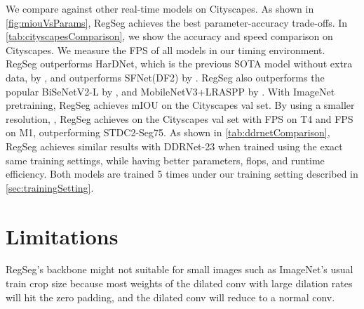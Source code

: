 \documentclass[10pt,twocolumn,letterpaper]{article}
\begin{document}
\begin{table}
  \centering
  \caption{Comparison against DDRNet-23 under the exact same training setting. FPS of both models are calculated using \cref{sec:timing}. RegSeg achieves higher FPS and better parameters and flops efficiency while maintaining similar accuracy.}
  \label{tab:ddrnetComparison}
\end{table}

We compare against other real-time models on Cityscapes. As shown in \cref{fig:miouVsParams}, RegSeg achieves the best parameter-accuracy trade-offs. In \cref{tab:cityscapesComparison}, we show the accuracy and speed comparison on Cityscapes. We measure the FPS of all models in our timing environment. RegSeg outperforms HarDNet\cite{hardnet}, which is the previous SOTA model without extra data, by , and outperforms SFNet(DF2)\cite{sfnet} by . RegSeg also outperforms the popular BiSeNetV2-L\cite{bisenetv2} by , and MobileNetV3+LRASPP\cite{mobilenetv32019} by . With ImageNet pretraining, RegSeg achieves  mIOU on the Cityscapes val set. By using a smaller resolution, , RegSeg achieves  on the Cityscapes val set with  FPS on T4 and  FPS on M1, outperforming STDC2-Seg75\cite{stdc}. As shown in \cref{tab:ddrnetComparison}, RegSeg achieves similar results with DDRNet-23 when trained using the exact same training settings, while having better parameters, flops, and runtime efficiency. Both models are trained 5 times under our training setting described in \cref{sec:trainingSetting}.



\section{Limitations}
RegSeg's backbone might not suitable for small images such as ImageNet's usual  train crop size because most weights of the  dilated conv with large dilation rates will hit the zero padding, and the dilated conv will reduce to a normal  conv.
\end{document}
